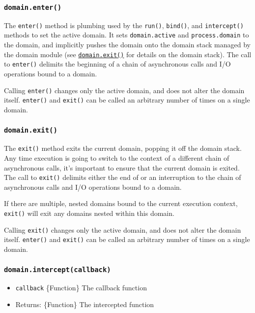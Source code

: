 \subsubsection{\texorpdfstring{\texttt{domain.enter()}}{domain.enter()}}\label{domain.enter}

The \texttt{enter()} method is plumbing used by the \texttt{run()},
\texttt{bind()}, and \texttt{intercept()} methods to set the active
domain. It sets \texttt{domain.active} and \texttt{process.domain} to
the domain, and implicitly pushes the domain onto the domain stack
managed by the domain module (see
\hyperref[domainexit]{\texttt{domain.exit()}} for details on the domain
stack). The call to \texttt{enter()} delimits the beginning of a chain
of asynchronous calls and I/O operations bound to a domain.

Calling \texttt{enter()} changes only the active domain, and does not
alter the domain itself. \texttt{enter()} and \texttt{exit()} can be
called an arbitrary number of times on a single domain.

\subsubsection{\texorpdfstring{\texttt{domain.exit()}}{domain.exit()}}\label{domain.exit}

The \texttt{exit()} method exits the current domain, popping it off the
domain stack. Any time execution is going to switch to the context of a
different chain of asynchronous calls, it's important to ensure that the
current domain is exited. The call to \texttt{exit()} delimits either
the end of or an interruption to the chain of asynchronous calls and I/O
operations bound to a domain.

If there are multiple, nested domains bound to the current execution
context, \texttt{exit()} will exit any domains nested within this
domain.

Calling \texttt{exit()} changes only the active domain, and does not
alter the domain itself. \texttt{enter()} and \texttt{exit()} can be
called an arbitrary number of times on a single domain.

\subsubsection{\texorpdfstring{\texttt{domain.intercept(callback)}}{domain.intercept(callback)}}\label{domain.interceptcallback}

\begin{itemize}
\tightlist
\item
  \texttt{callback} \{Function\} The callback function
\item
  Returns: \{Function\} The intercepted function
\end{itemize}

